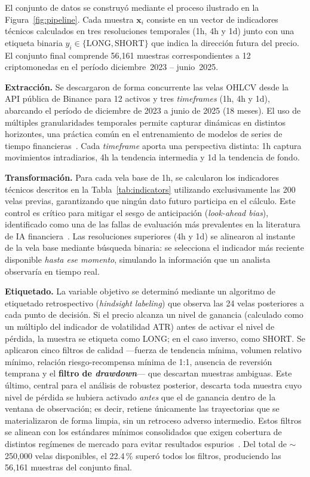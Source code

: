 \documentclass[10pt,twocolumn]{article}
\begin{document}
El conjunto de datos se construy\'o mediante el proceso ilustrado en la Figura~\ref{fig:pipeline}. Cada muestra $\mathbf{x}_i$ consiste en un vector de indicadores t\'ecnicos calculados en tres resoluciones temporales (1h, 4h y 1d) junto con una etiqueta binaria $y_i \in \{\text{LONG}, \text{SHORT}\}$ que indica la direcci\'on futura del precio. El conjunto final comprende 56,161 muestras correspondientes a 12 criptomonedas en el per\'iodo diciembre~2023 -- junio~2025.

\textbf{Extracci\'on.} Se descargaron de forma concurrente las velas OHLCV desde la API p\'ublica de Binance para 12 activos y tres \textit{timeframes} (1h, 4h y 1d), abarcando el per\'iodo de diciembre de 2023 a junio de 2025 (18 meses). El uso de m\'ultiples granularidades temporales permite capturar din\'amicas en distintos horizontes, una pr\'actica com\'un en el entrenamiento de modelos de series de tiempo financieras~\cite{fu2024}. Cada \textit{timeframe} aporta una perspectiva distinta: 1h captura movimientos intradiarios, 4h la tendencia intermedia y 1d la tendencia de fondo.

\textbf{Transformaci\'on.} Para cada vela base de 1h, se calcularon los indicadores t\'ecnicos descritos en la Tabla~\ref{tab:indicators} utilizando exclusivamente las 200 velas previas, garantizando que ning\'un dato futuro participa en el c\'alculo. Este control es cr\'itico para mitigar el sesgo de anticipaci\'on (\textit{look-ahead bias}), identificado como una de las fallas de evaluaci\'on m\'as prevalentes en la literatura de IA financiera~\cite{nguyen2026}. Las resoluciones superiores (4h y 1d) se alinearon al instante de la vela base mediante b\'usqueda binaria: se selecciona el indicador m\'as reciente disponible \textit{hasta ese momento}, simulando la informaci\'on que un analista observar\'ia en tiempo real.

\textbf{Etiquetado.} La variable objetivo se determin\'o mediante un algoritmo de etiquetado retrospectivo (\textit{hindsight labeling}) que observa las 24 velas posteriores a cada punto de decisi\'on. Si el precio alcanza un nivel de ganancia (calculado como un m\'ultiplo del indicador de volatilidad ATR) antes de activar el nivel de p\'erdida, la muestra se etiqueta como LONG; en el caso inverso, como SHORT. Se aplicaron cinco filtros de calidad ---fuerza de tendencia m\'inima, volumen relativo m\'inimo, relaci\'on riesgo-recompensa m\'inima de 1:1, ausencia de reversi\'on temprana y el \textbf{filtro de \textit{drawdown}}--- que descartan muestras ambiguas. Este \'ultimo, central para el an\'alisis de robustez posterior, descarta toda muestra cuyo nivel de p\'erdida se hubiera activado \textit{antes} que el de ganancia dentro de la ventana de observaci\'on; es decir, retiene \'unicamente las trayectorias que se materializaron de forma limpia, sin un retroceso adverso intermedio. Estos filtros se alinean con los est\'andares m\'inimos consolidados que exigen cobertura de distintos reg\'imenes de mercado para evitar resultados espurios~\cite{pindza2026}. Del total de $\sim$250,000 velas disponibles, el 22.4\,\% super\'o todos los filtros, produciendo las 56,161 muestras del conjunto final.
\end{document}
